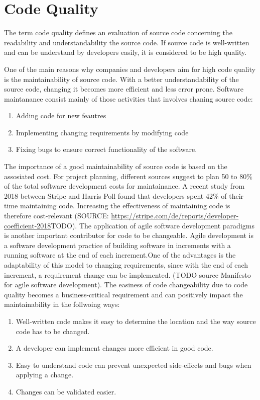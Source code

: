 \section{Code Quality}\label{sec:code_quality}
The term code quality defines an evaluation of source code concerning the readability and understandability the source code. If source code is well-written and can be understand by developers easily, it is considered to be high quality.

One of the main reasons why companies and developers aim for high code quality is the maintainability of source code. With a better understandability of the source code, changing it becomes more efficient and less error prone.
Software maintanance consist mainly of those activities that involves chaning source code:
\begin{enumerate}
    \item Adding code for new feautres
    \item Implementing changing requirements by modifying code
    \item Fixing bugs to ensure correct functionality of the software.
\end{enumerate}
The importance of a good maintainability of source code is based on the assosiated cost.
For project planning, different sources suggest to plan 50 to 80\% of the total software development costs for maintainance. A recent study from 2018 between Stripe and Harris Poll found that developers spent 42\% of their time maintaining code. Increasing the effectiveness of maintaining code is therefore cost-relevant (SOURCE: \url{https://stripe.com/de/reports/developer-coefficient-2018}TODO).
The application of agile software development paradigms is another important contributor for code to be changeable. Agile development is a software development practice of building software in increments with a running software at the end of each increment.One of the advantages is the adaptability of this model to changing requirements, since with the end of each increment, a requirement change can be implemented. (TODO source Manifesto for agile software development).
The easiness of code changeability due to code quality becomes a business-critical requirement and can positively impact the maintainability in the follwoing ways\cite{baggen_standardized_2012}:
\begin{enumerate}
    \item Well-written code makes it easy to determine the location and the way source code has to be changed.
    \item A developer can implement changes more efficient in good code.
    \item Easy to understand code can prevent unexpected side-effects and bugs when applying a change.
    \item Changes can be validated easier. 
\end{enumerate}

